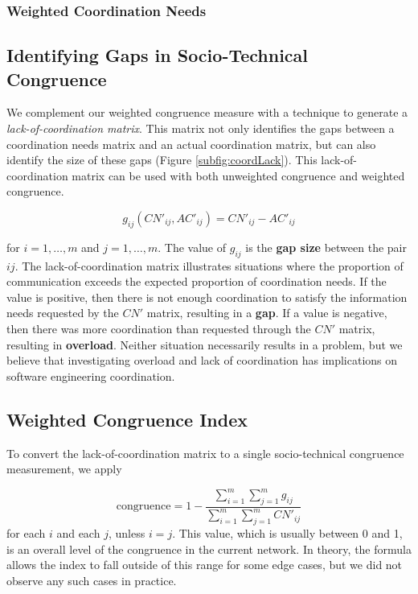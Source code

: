 \subsubsection{Weighted Coordination Needs}
\label{subsec:ourmeasure}
\subsection{Identifying Gaps in Socio-Technical Congruence}
\label{sec:lack}
We complement our
weighted congruence measure with a technique to generate a \emph{lack-of-coordination matrix}. This matrix not only identifies the
gaps between a coordination needs matrix and an actual coordination matrix, but can also identify the size of these gaps (Figure \ref{subfig:coordLack}). This lack-of-coordination matrix can be used with both unweighted congruence and weighted congruence.

 \[ g_{ij}(CN'_{ij}, AC'_{ij}) = CN'_{ij} - AC'_{ij} \]

\noindent for $i=1,\dots,m$ and $j=1,\dots,m$. The value of $g_{ij}$ is the \textbf{gap size} between the pair $ij$. The lack-of-coordination matrix illustrates situations where the proportion of communication exceeds the expected proportion of coordination needs. If the value is positive, then there is not enough coordination to satisfy the information needs requested by the $CN'$ matrix, resulting in a \textbf{gap}. If a value is negative, then there was more coordination than requested through the $CN'$ matrix, resulting in \textbf{overload}.  Neither situation necessarily results in a problem, but we believe that investigating overload and lack of coordination has implications on software engineering coordination.

\subsection{Weighted Congruence Index}
To convert the lack-of-coordination matrix to a single socio-technical congruence measurement, we apply

\[ \text{congruence} = 1 - \frac{\displaystyle\sum^{m}_{i=1} \sum^{m}_{j=1} g_{ij}}{\displaystyle\sum^{m}_{i=1}\sum^{m}_{j=1}CN'_{ij}} \]
\noindent for each $i$ and each $j$, unless $i=j$. This value, which is usually between 0 and 1, is an overall level of the congruence in the current network. In theory, the formula allows the index to fall outside of this range for some edge cases, but we did not observe any such cases in practice.

